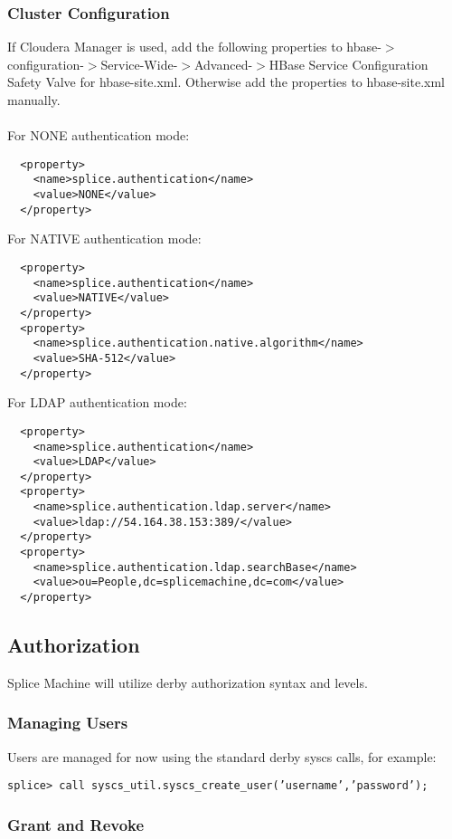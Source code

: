 \documentclass{article}
\begin{document}
\subsubsection{Cluster Configuration}
If Cloudera Manager is used, add the following properties to hbase-$>$configuration-$>$Service-Wide-$>$Advanced-$>$HBase Service Configuration Safety Valve for hbase-site.xml. Otherwise add the properties to hbase-site.xml manually. \\ \\
For NONE authentication mode:
\begin{lstlisting}
  <property> 
    <name>splice.authentication</name> 
    <value>NONE</value> 
  </property> 
\end{lstlisting}
For NATIVE authentication mode: 
\begin{lstlisting}
  <property> 
    <name>splice.authentication</name> 
    <value>NATIVE</value> 
  </property> 
  <property> 
    <name>splice.authentication.native.algorithm</name> 
    <value>SHA-512</value> 
  </property> 
\end{lstlisting} 
For LDAP authentication mode: 
\begin{lstlisting}
  <property> 
    <name>splice.authentication</name> 
    <value>LDAP</value> 
  </property> 
  <property> 
    <name>splice.authentication.ldap.server</name> 
    <value>ldap://54.164.38.153:389/</value> 
  </property> 
  <property> 
    <name>splice.authentication.ldap.searchBase</name> 
    <value>ou=People,dc=splicemachine,dc=com</value> 
  </property> 
\end{lstlisting}
 

\subsection{Authorization}
Splice Machine will utilize derby authorization syntax and levels. 

\subsubsection{Managing Users}
Users are managed for now using the standard derby syscs calls, for example:

\texttt{splice> call syscs\_util.syscs\_create\_user('username','password');}

\subsubsection{Grant and Revoke}
\end{document}
